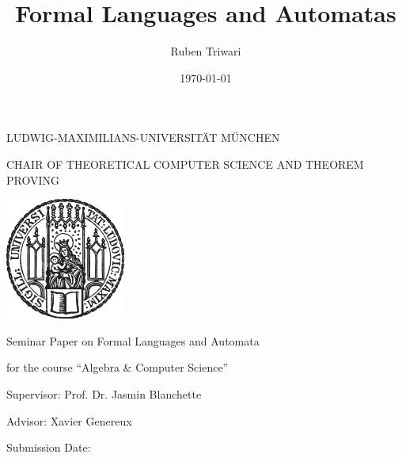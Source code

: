 \documentclass[12pt,letterpaper]{article}
\author{Ruben Triwari}
\begin{document}
\begin{center}\uppercase{Ludwig-Maximilians-Universität München}\end{center}
\begin{center}\uppercase{Chair of Theoretical Computer Science and Theorem Proving}\end{center}

\vspace*{10mm}
\begin{center}
\includegraphics[height=40mm]{sigillum.png}
\end{center}
\vspace*{10mm}
\title{Formal Languages and Automatas}
\date{\vspace{-3ex}}
{\let\newpage\relax\maketitle}
\thispagestyle{empty}

\begin{center}
\begin{large}
\begin{Large}
Seminar Paper on Formal Languages and Automata\\
\end{Large}
for the course ``Algebra \& Computer Science'' \\
\end{large}
\end{center}
\vspace{1cm}
\begin{center}
\begin{large}
Supervisor: Prof. Dr. Jasmin Blanchette\\
\end{large}
\end{center}
\begin{center}
\begin{large}
Advisor: Xavier Genereux\\
\end{large}
\end{center}


\begin{center}
\begin{large}
Submission Date: \date{\today} \\
\end{large}
\end{center}
\end{document}
